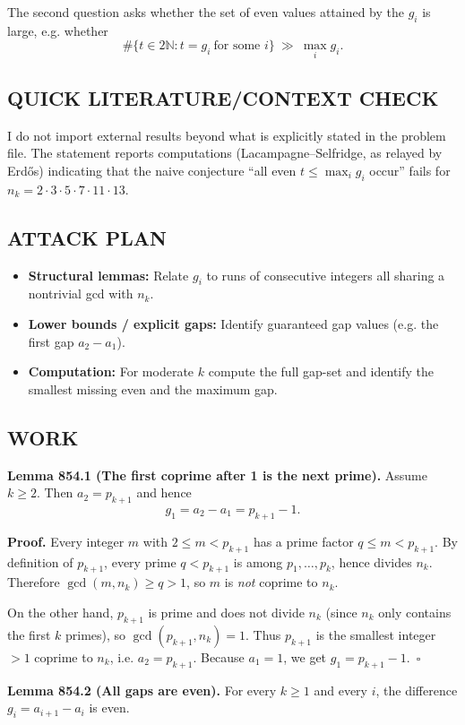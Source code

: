 The second question asks whether the set of even values attained by the $g_i$ is large, e.g. whether
\[
  \#\{t\in 2\mathbb{N}: t=g_i\ \text{for some }i\}\ \gg\ \max_i g_i.
\]

\subsection*{QUICK LITERATURE/CONTEXT CHECK}
I do not import external results beyond what is explicitly stated in the problem file. The statement reports computations (Lacampagne--Selfridge, as relayed by Erd\H{o}s) indicating that the naive conjecture ``all even $t\le \max_i g_i$ occur'' fails for $n_k=2\cdot 3\cdot 5\cdot 7\cdot 11\cdot 13$.

\subsection*{ATTACK PLAN}
\begin{itemize}
\item \textbf{Structural lemmas:} Relate $g_i$ to runs of consecutive integers all sharing a nontrivial gcd with $n_k$.
\item \textbf{Lower bounds / explicit gaps:} Identify guaranteed gap values (e.g. the first gap $a_2-a_1$).
\item \textbf{Computation:} For moderate $k$ compute the full gap-set and identify the smallest missing even and the maximum gap.
\end{itemize}

\subsection*{WORK}
\textbf{Lemma 854.1 (The first coprime after 1 is the next prime).}
Assume $k\ge 2$. Then $a_2=p_{k+1}$ and hence
\[
  g_1=a_2-a_1=p_{k+1}-1.
\]

\textbf{Proof.}
Every integer $m$ with $2\le m < p_{k+1}$ has a prime factor $q\le m < p_{k+1}$. By definition of $p_{k+1}$, every prime $q<p_{k+1}$ is among $p_1,\dots,p_k$, hence divides $n_k$. Therefore $\gcd(m,n_k)\ge q>1$, so $m$ is \emph{not} coprime to $n_k$.

On the other hand, $p_{k+1}$ is prime and does not divide $n_k$ (since $n_k$ only contains the first $k$ primes), so $\gcd(p_{k+1},n_k)=1$. Thus $p_{k+1}$ is the smallest integer $>1$ coprime to $n_k$, i.e. $a_2=p_{k+1}$. Because $a_1=1$, we get $g_1=p_{k+1}-1$.\ $\square$

\medskip
\textbf{Lemma 854.2 (All gaps are even).}
For every $k\ge 1$ and every $i$, the difference $g_i=a_{i+1}-a_i$ is even.

